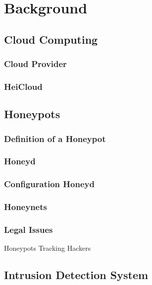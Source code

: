 \chapter{Background}

\section{Cloud Computing}

\subsection{Cloud Provider}

\subsection{HeiCloud}

\section{Honeypots}

\subsection{Definition of a Honeypot}

\subsection{Honeyd}

\subsection{Configuration Honeyd}

\subsection{Honeynets}

\subsection{Legal Issues}

Honeypots Tracking Hackers

\section{Intrusion Detection System}
